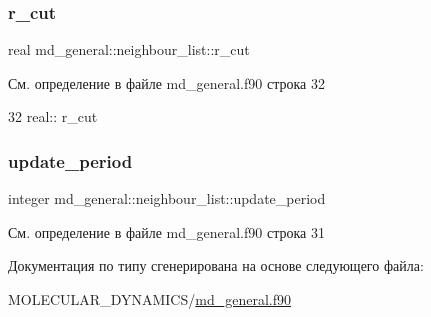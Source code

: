 \subsubsection{\texorpdfstring{r\+\_\+cut}{r\_cut}}
{\footnotesize\ttfamily real md\+\_\+general\+::neighbour\+\_\+list\+::r\+\_\+cut}



См. определение в файле md\+\_\+general.\+f90 строка 32


\begin{DoxyCode}
32     \textcolor{keywordtype}{real}:: r\_cut
\end{DoxyCode}
\mbox{\label{structmd__general_1_1neighbour__list_a5c1f0bad546bc4997cc802c0db9b163a}} 
\subsubsection{\texorpdfstring{update\+\_\+period}{update\_period}}
{\footnotesize\ttfamily integer md\+\_\+general\+::neighbour\+\_\+list\+::update\+\_\+period}



См. определение в файле md\+\_\+general.\+f90 строка 31



Документация по типу сгенерирована на основе следующего файла\+:\begin{DoxyCompactItemize}
\item 
M\+O\+L\+E\+C\+U\+L\+A\+R\+\_\+\+D\+Y\+N\+A\+M\+I\+C\+S/\mbox{\hyperlink{md__general_8f90}{md\+\_\+general.\+f90}}\end{DoxyCompactItemize}
